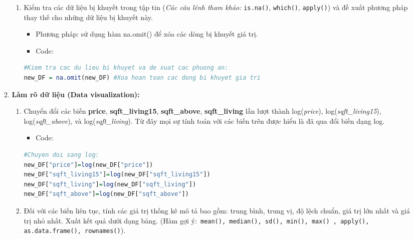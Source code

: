 \documentclass[a4paper]{article}
\theoremstyle{definition}
\begin{document}
\begin{itemize}
\begin{enumerate}
\begin{enumerate}
        \item  Kiểm tra các dữ liệu bị khuyết trong tập tin (\textit{Các câu lênh tham khảo:} \texttt{is.na()}, \texttt{which()}, \texttt{apply()}) và đề xuất phương pháp thay thế cho những dữ liệu bị khuyết này.
        
\begin{itemize}
    \item Phương pháp: sử dụng hàm na.omit() để xóa các dòng bị khuyết giá trị.
    \item Code:
\end{itemize}
        
        \begin{lstlisting}[language=R, caption=Code for question 2b]
#Kiem tra cac du lieu bi khuyet va de xuat cac phuong an:
new_DF = na.omit(new_DF) #Xoa hoan toan cac dong bi khuyet gia tri
        \end{lstlisting}
        
    \end{enumerate}
    \item \textbf{Làm rõ dữ liệu (Data visualization):}
    \begin{enumerate}
        \item Chuyển đổi các biến \textbf{price}, \textbf{sqft\_living15}, \textbf{sqft\_above}, \textbf{sqft\_living} lần lượt thành log(\textit{price}), log(\textit{sqft\_living15}), log(\textit{sqft\_above}), và log(\textit{sqft\_living}). Từ đây mọi sự tính toán với các biến trên được hiểu là đã qua đổi biến dạng log.
        
        \begin{itemize}
            \item Code:
        \end{itemize}
        
    \begin{lstlisting}[language=R, caption=Code for question 3a]
#Chuyen doi sang log:
new_DF["price"]=log(new_DF["price"])
new_DF["sqft_living15"]=log(new_DF["sqft_living15"])
new_DF["sqft_living"]=log(new_DF["sqft_living"])
new_DF["sqft_above"]=log(new_DF["sqft_above"])
    \end{lstlisting}   
        
        
        \item Đối với các biến liên tục, tính các giá trị thống kê mô tả bao gồm: trung bình, trung vị, độ lệch chuẩn, giá trị lớn nhất và giá trị nhỏ nhất. Xuất kết quả dưới dạng bảng. (Hàm gợi ý:\texttt{ mean(), median(), sd(), min(), max() , apply(), as.data.frame(), rownames()}).
        

\end{enumerate}
\end{enumerate}
\end{itemize}
\end{document}
